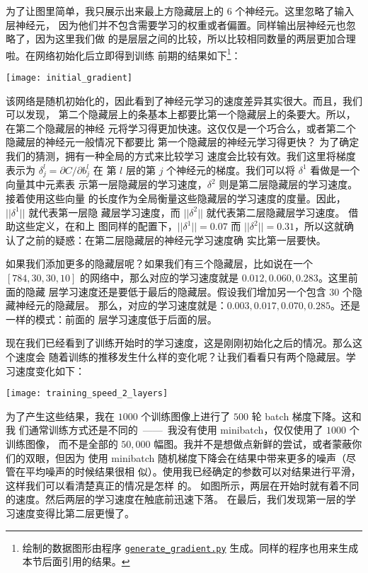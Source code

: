 为了让图里简单，我只展示出来最上方隐藏层上的 $6$ 个神经元。这里忽略了输入层神经元，
因为他们并不包含需要学习的权重或者偏置。同样输出层神经元也忽略了，因为这里我们做
的是层层之间的比较，所以比较相同数量的两层更加合理啦。在网络初始化后立即得到训练
前期的结果如下\footnote{绘制的数据图形由程序 \href{https://github.com/mnielsen/neural-networks-and-deep-learning/blob/master/fig/generate_gradient.py}{\lstinline!generate_gradient.py!}
  生成。同样的程序也用来生成本节后面引用的结果。}：
\begin{center}
  \texttt{[image: initial\_gradient]}
\end{center}

该网络是随机初始化的，因此看到了神经元学习的速度差异其实很大。而且，我们可以发现，
第二个隐藏层上的条基本上都要比第一个隐藏层上的条要大。所以，在第二个隐藏层的神经
元将学习得更加快速。这仅仅是一个巧合么，或者第二个隐藏层的神经元一般情况下都要比
第一个隐藏层的神经元学习得更快？ 为了确定我们的猜测，拥有一种全局的方式来比较学习
速度会比较有效。我们这里将梯度表示为 $\delta_j^l = \partial C/\partial b_j^l$ 在
第 $l$ 层的第 $j$ 个神经元的梯度。我们可以将 $\delta^1$ 看做是一个向量其中元素表
示第一层隐藏层的学习速度，$\delta^2$ 则是第二层隐藏层的学习速度。接着使用这些向量
的长度作为全局衡量这些隐藏层的学习速度的度量。因此，$||\delta^1||$ 就代表第一层隐
藏层学习速度，而 $||\delta^2||$ 就代表第二层隐藏层学习速度。 借助这些定义，在和上
图同样的配置下，$||\delta^1|| = 0.07$ 而
$||\delta^2|| = 0.31$，所以这就确认了之前的疑惑：在第二层隐藏层的神经元学习速度确
实比第一层要快。
 
如果我们添加更多的隐藏层呢？如果我们有三个隐藏层，比如说在一个 $[784, 30, 30,
  10]$ 的网络中，那么对应的学习速度就是 $0.012, 0.060, 0.283$。这里前面的隐藏
层学习速度还是要低于最后的隐藏层。假设我们增加另一个包含 30 个隐藏神经元的隐藏层。
那么，对应的学习速度就是：$0.003, 0.017, 0.070, 0.285$。还是一样的模式：前面的
层学习速度低于后面的层。

现在我们已经看到了训练开始时的学习速度，这是刚刚初始化之后的情况。那么这个速度会
随着训练的推移发生什么样的变化呢？让我们看看只有两个隐藏层。学习速度变化如下：
\begin{center}
  \texttt{[image: training\_speed\_2\_layers]}
\end{center}
 
为了产生这些结果，我在 $1000$ 个训练图像上进行了 $500$ 轮 batch 梯度下降。这和我
们通常训练方式还是不同的~——~我没有使用 minibatch，仅仅使用了 $1000$ 个训练图像，
而不是全部的 $50,000$ 幅图。我并不是想做点新鲜的尝试，或者蒙蔽你们的双眼，但因为
使用 minibatch 随机梯度下降会在结果中带来更多的噪声（尽管在平均噪声的时候结果很相
似）。使用我已经确定的参数可以对结果进行平滑，这样我们可以看清楚真正的情况是怎样
的。 如图所示，两层在开始时就有着不同的速度。然后两层的学习速度在触底前迅速下落。
在最后，我们发现第一层的学习速度变得比第二层更慢了。
 
